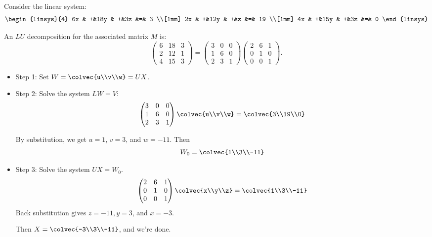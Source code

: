 
\begin{example}
Consider the linear system:
\[
      \begin{linsys}{4}
            6x & +&18y & +&3z         &=& 3  \\[1mm]
            2x & +&12y & +&z	    &=& 19 \\[1mm]
            4x & +&15y & +&3z         &=& 0  
      \end{linsys}
\]

An $LU$ decomposition for the associated matrix $M$ is:
\[
\begin{pmatrix}
6 & 18 & 3 \\
2 & 12 & 1 \\
4 & 15 & 3 
\end{pmatrix} =
\begin{pmatrix}
3 & 0 & 0 \\
1 & 6 & 0 \\
2 & 3 & 1 
\end{pmatrix}
\begin{pmatrix}
2 & 6 & 1 \\
0 & 1 & 0 \\
0 & 0 & 1 
\end{pmatrix}.
\]

\begin{itemize}
\item{Step 1:} \hypertarget{LUproc}{Set} $W=\colvec{u\\v\\w}=UX$.  

\item{Step 2:} Solve the system $LW=V$:
\[
\begin{pmatrix}
3 & 0 & 0 \\
1 & 6 & 0 \\
2 & 3 & 1 
\end{pmatrix}
\colvec{u\\v\\w} =
\colvec{3\\19\\0}
\]

By substitution, we get $u=1$, $v=3$, and $w=-11$.  Then 
\[W_0=\colvec{1\\3\\-11}\]

\item{Step 3:} Solve the system $UX=W_0$.  
\[
\begin{pmatrix}
2 & 6 & 1 \\
0 & 1 & 0 \\
0 & 0 & 1 
\end{pmatrix}
\colvec{x\\y\\z} =
\colvec{1\\3\\-11}
\]
Back substitution gives $z=-11, y=3$, and $x=-3$.  

Then $X=\colvec{-3\\3\\-11}$, and we're done.
\end{itemize}
\end{example}

